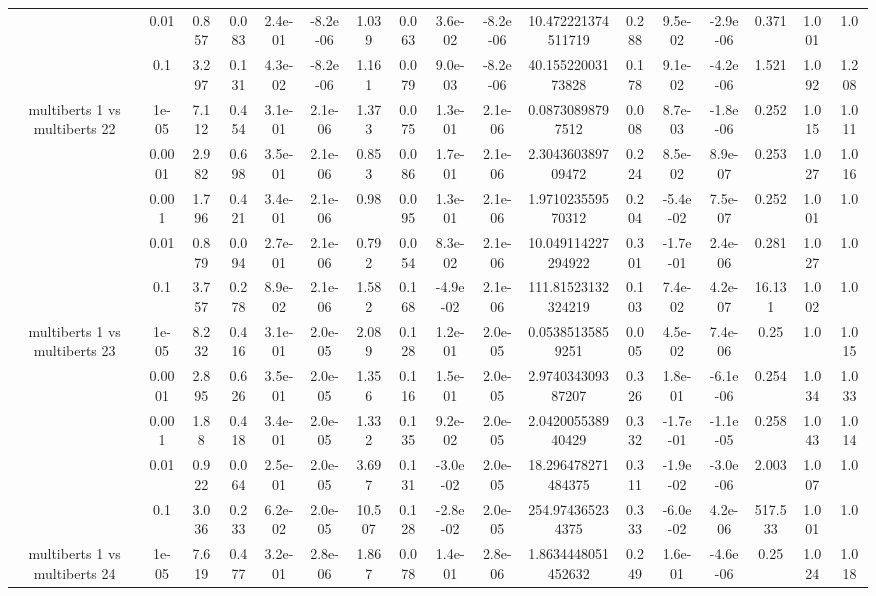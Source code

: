 \begin{tabular}{|c|c|c|c|c|c|c|c|c|c|c|c|c|c|c|c|c|}
 & 0.01 & 0.857 & 0.083 & 2.4e-01 & -8.2e-06 & 1.039 & 0.063 & 3.6e-02 & -8.2e-06 & 10.472221374511719 & 0.288 & 9.5e-02 & -2.9e-06 & 0.371 & 1.001 & 1.0 \\
 & 0.1 & 3.297 & 0.131 & 4.3e-02 & -8.2e-06 & 1.161 & 0.079 & 9.0e-03 & -8.2e-06 & 40.15522003173828 & 0.178 & 9.1e-02 & -4.2e-06 & 1.521 & 1.092 & 1.208 \\
\hline
\multirow{5}{*}{multiberts 1 vs multiberts 22} & 1e-05 & 7.112 & 0.454 & 3.1e-01 & 2.1e-06 & 1.373 & 0.075 & 1.3e-01 & 2.1e-06 & 0.08730898797512 & 0.008 & 8.7e-03 & -1.8e-06 & 0.252 & 1.015 & 1.011 \\
 & 0.0001 & 2.982 & 0.698 & 3.5e-01 & 2.1e-06 & 0.853 & 0.086 & 1.7e-01 & 2.1e-06 & 2.304360389709472 & 0.224 & 8.5e-02 & 8.9e-07 & 0.253 & 1.027 & 1.016 \\
 & 0.001 & 1.796 & 0.421 & 3.4e-01 & 2.1e-06 & 0.98 & 0.095 & 1.3e-01 & 2.1e-06 & 1.971023559570312 & 0.204 & -5.4e-02 & 7.5e-07 & 0.252 & 1.001 & 1.0 \\
 & 0.01 & 0.879 & 0.094 & 2.7e-01 & 2.1e-06 & 0.792 & 0.054 & 8.3e-02 & 2.1e-06 & 10.049114227294922 & 0.301 & -1.7e-01 & 2.4e-06 & 0.281 & 1.027 & 1.0 \\
 & 0.1 & 3.757 & 0.278 & 8.9e-02 & 2.1e-06 & 1.582 & 0.168 & -4.9e-02 & 2.1e-06 & 111.81523132324219 & 0.103 & 7.4e-02 & 4.2e-07 & 16.131 & 1.002 & 1.0 \\
\hline
\multirow{5}{*}{multiberts 1 vs multiberts 23} & 1e-05 & 8.232 & 0.416 & 3.1e-01 & 2.0e-05 & 2.089 & 0.128 & 1.2e-01 & 2.0e-05 & 0.05385135859251 & 0.005 & 4.5e-02 & 7.4e-06 & 0.25 & 1.0 & 1.015 \\
 & 0.0001 & 2.895 & 0.626 & 3.5e-01 & 2.0e-05 & 1.356 & 0.116 & 1.5e-01 & 2.0e-05 & 2.974034309387207 & 0.326 & 1.8e-01 & -6.1e-06 & 0.254 & 1.034 & 1.033 \\
 & 0.001 & 1.88 & 0.418 & 3.4e-01 & 2.0e-05 & 1.332 & 0.135 & 9.2e-02 & 2.0e-05 & 2.042005538940429 & 0.332 & -1.7e-01 & -1.1e-05 & 0.258 & 1.043 & 1.014 \\
 & 0.01 & 0.922 & 0.064 & 2.5e-01 & 2.0e-05 & 3.697 & 0.131 & -3.0e-02 & 2.0e-05 & 18.296478271484375 & 0.311 & -1.9e-02 & -3.0e-06 & 2.003 & 1.007 & 1.0 \\
 & 0.1 & 3.036 & 0.233 & 6.2e-02 & 2.0e-05 & 10.507 & 0.128 & -2.8e-02 & 2.0e-05 & 254.974365234375 & 0.333 & -6.0e-02 & 4.2e-06 & 517.533 & 1.001 & 1.0 \\
\hline
\multirow{5}{*}{multiberts 1 vs multiberts 24} & 1e-05 & 7.619 & 0.477 & 3.2e-01 & 2.8e-06 & 1.867 & 0.078 & 1.4e-01 & 2.8e-06 & 1.8634448051452632 & 0.249 & 1.6e-01 & -4.6e-06 & 0.25 & 1.024 & 1.018 \\

\end{tabular}
